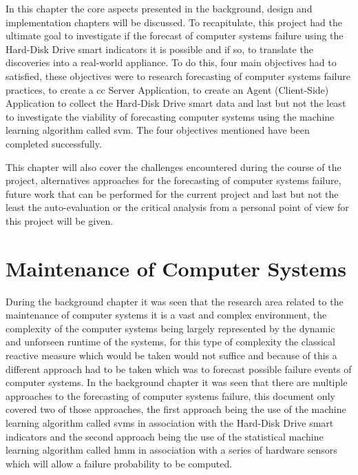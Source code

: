 In this chapter the core aspects presented in the background, design and implementation chapters
will be discussed. To recapitulate, this project had the ultimate goal to investigate
if the forecast of computer systems failure using the Hard-Disk Drive \acrfull{smart} indicators
it is possible and if so, to translate the discoveries into a real-world appliance.
To do this, four main objectives had to satisfied, these objectives were to
research forecasting of computer systems failure practices, to create a \acrfull{cc} Server
Application, to create an Agent (Client-Side) Application to collect the Hard-Disk Drive
\acrfull{smart} data and last but not the least to investigate the viability of forecasting
computer systems using the machine learning algorithm called \acrfull{svm}.
The four objectives mentioned have been completed successfully.

This chapter will also cover the challenges encountered during the course of the project,
alternatives approaches for the forecasting of computer systems failure, future work that can be performed for the current
project and last but not the least the auto-evaluation or the critical analysis from a
personal point of view for this project will be given.

\section{Maintenance of Computer Systems}

During the background chapter it was seen that the research area related to the
maintenance of computer systems it is a vast and complex environment, the complexity of the
computer systems being largely represented by the dynamic and unforseen runtime of the
systems, for this type of complexity the classical reactive measure which would be taken
would not suffice and because of this a different approach had to be taken which was to
forecast possible failure events of computer systems.
In the background chapter it was seen that there are multiple approaches to the forecasting
of computer systems failure, this document only covered two of those approaches, the first
approach being the use of the machine learning algorithm called \acrfull{svms} in association with the
Hard-Disk Drive \acrfull{smart} indicators and the second approach being the use of the
statistical machine learning algorithm called \acrfull{hmm} in association with a series of
hardware sensors which will allow a failure probability to be computed.

